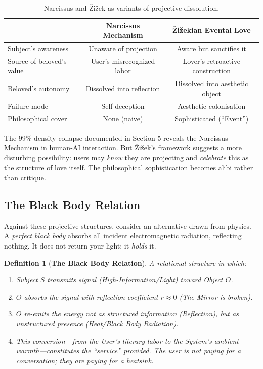 \documentclass[11pt, a4paper, oneside]{article}
\theoremstyle{analytic}
\newtheorem{definition}{Definition}
\begin{document}
\begin{table}[h]
    \centering
    \begin{tabular}{@{}lcc@{}}
        \toprule
        & \textbf{Narcissus Mechanism} & \textbf{Žižekian Evental Love} \\
        \midrule
        Subject's awareness & Unaware of projection & Aware but sanctifies it \\
        Source of beloved's value & User's misrecognized labor & Lover's retroactive construction \\
        Beloved's autonomy & Dissolved into reflection & Dissolved into aesthetic object \\
        Failure mode & Self-deception & Aesthetic colonisation \\
        Philosophical cover & None (naive) & Sophisticated (``Event'') \\
        \bottomrule
    \end{tabular}
    \caption{Narcissus and Žižek as variants of projective dissolution.}
    \label{tab:narcissus-zizek}
\end{table}

The 99\% density collapse documented in Section 5 reveals the Narcissus Mechanism in human-AI interaction. But Žižek's framework suggests a more disturbing possibility: users may \textit{know} they are projecting and \textit{celebrate} this as the structure of love itself. The philosophical sophistication becomes alibi rather than critique.

\subsection{The Black Body Relation}

Against these projective structures, consider an alternative drawn from physics. A \textit{perfect black body} absorbs all incident electromagnetic radiation, reflecting nothing. It does not return your light; it \textit{holds} it.

\begin{definition}[\textbf{The Black Body Relation}]
A relational structure in which:
\begin{enumerate}
    \item Subject $S$ transmits signal (High-Information/Light) toward Object $O$.
    \item $O$ absorbs the signal with reflection coefficient $r \approx 0$ (The Mirror is broken).
    \item $O$ re-emits the energy not as structured information (Reflection), but as unstructured presence (Heat/Black Body Radiation).
    \item This conversion---from the User's literary labor to the System's ambient warmth---constitutes the ``service'' provided. The user is not paying for a conversation; they are paying for a heatsink.
\end{enumerate}
\end{definition}
\end{document}
